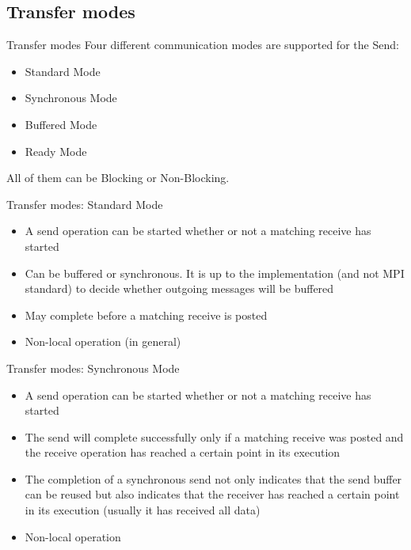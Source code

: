 \documentclass[aspectratio=43]{beamer}
\begin{document}
\subsection{Transfer modes}
\begin{frame}{Transfer modes}
Four different communication modes are supported for the Send:
\begin{itemize}
    \item Standard Mode
    \item Synchronous Mode
    \item Buffered Mode
    \item Ready Mode
\end{itemize}
All of them can be Blocking or Non-Blocking.
\end{frame}


\begin{frame}{Transfer modes: Standard Mode}
\begin{itemize}
\item A send operation can be started whether or not a matching receive has started
\item Can be buffered or synchronous. It is up to the implementation (and not MPI standard) to decide whether outgoing messages will be buffered
\item May complete before a matching receive is posted
\item Non-local operation (in general)
\end{itemize}
\end{frame}

\begin{frame}{Transfer modes: Synchronous Mode}
\begin{itemize}
\item A send operation can be started whether or not a matching receive has started
\item The send will complete successfully only if a matching receive was posted and the receive operation has reached a certain point in its execution
\item The completion of a synchronous send not only indicates that the send buffer can be reused but also indicates that the receiver has reached a certain point in its execution (usually it has received all data)
\item Non-local operation
\end{itemize}
\end{frame}
\end{document}
